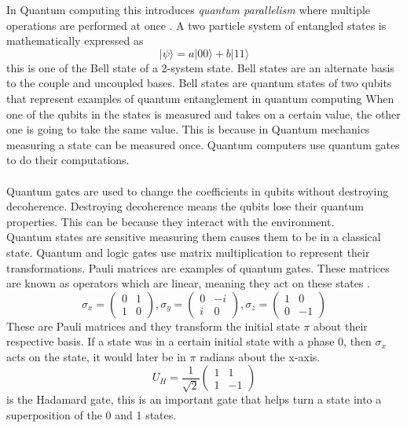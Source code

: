 \documentclass{Assignment}
\begin{document}
In Quantum computing this introduces \textit{quantum parallelism} where multiple operations are performed at once \cite{mcintyre_quantum_2012}.
A two particle system of entangled states is mathematically expressed as
 \begin{equation}
 	|\psi \rangle = a|00\rangle + b|11\rangle
 	\label{entagled_state}
 	\end{equation}
this is one of the Bell state of a 2-system state.
Bell states are an alternate basis to the couple and uncoupled bases\cite{mcintyre_quantum_2012}.
Bell states are quantum states of two qubits that represent examples of quantum entanglement in quantum computing
When one of the qubits in the states is measured and takes on a certain value, the other one is going to take the same value.
This is because in Quantum mechanics measuring a state can be measured once.
Quantum computers use quantum gates to do their computations\cite{AndrewSteane}.
\\\\
Quantum gates are used to change the coefficients in qubits without destroying decoherence.
Destroying decoherence means the qubits lose their quantum properties.
This can be because they interact with the environment.\\
Quantum states are sensitive measuring them causes them to be in a classical state.
Quantum and logic gates use matrix multiplication to represent their transformations.
Pauli matrices are examples of quantum gates.
These matrices are known as operators which are linear, meaning they act on these states \cite{AndrewSteane,mcintyre_quantum_2012}.
\begin{equation}
\sigma_x =\begin{pmatrix}
	0&1\\1&0
	\end{pmatrix},
	\sigma_y =\begin{pmatrix}
		0&-i\\i&0
	\end{pmatrix},\sigma_z =\begin{pmatrix}
	1&0\\0&-1
	\end{pmatrix}
\end{equation}
These are Pauli matrices and they transform the initial state $\pi$ about their respective basis.
If a state was in a certain initial state with a phase 0, then $\sigma_x$ acts on the state, it would later be in $\pi$ radians about the x-axis.
\begin{equation}U_H=\frac{1}{\sqrt{2}}
	\begin{pmatrix}
		1&1\\1&-1
	\end{pmatrix}
\end{equation} is the Hadamard gate, this is an important gate that helps turn a state into a superposition of the 0 and 1 states.
\end{document}
